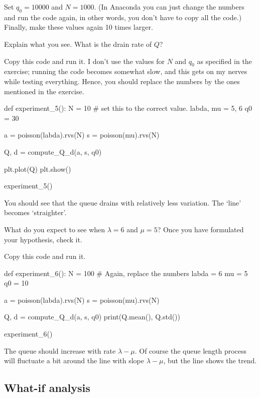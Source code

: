 \begin{exercise}
Set $q_0=10000$ and $N=1000$.  (In Anaconda you can just change the numbers and run the code again, in other words, you don't have to copy all the code.) Finally,  make these values again 10 times larger.

Explain what you see. What is the drain rate of $Q$?
\begin{solution}
  Copy this code and run it.
  I don't use the values for $N$ and $q_0$ as specified in the exercise; running the code becomes somewhat slow, and this gets on my nerves while testing everything.
  Hence, you should replace the numbers by the ones mentioned in the exercise.

\begin{pyverbatim}
def experiment_5():
    N = 10  # set this to the correct value.
    labda, mu = 5, 6
    q0 = 30

    a = poisson(labda).rvs(N)
    s = poisson(mu).rvs(N)

    Q, d = compute_Q_d(a, s, q0)

    plt.plot(Q)
    plt.show()


experiment_5()
\end{pyverbatim}

You should see that the queue drains with relatively less variation. The `line' becomes `straighter'.
\end{solution}
\end{exercise}

\begin{exercise}
What do you expect to see when $\lambda=6$ and $\mu=5$? Once you have formulated your hypothesis, check it.
\begin{solution}
Copy this code and run it.
\begin{pyverbatim}
def experiment_6():
    N = 100  # Again, replace the numbers
    labda = 6
    mu = 5
    q0 = 10

    a = poisson(labda).rvs(N)
    s = poisson(mu).rvs(N)

    Q, d = compute_Q_d(a, s, q0)
    print(Q.mean(), Q.std())


experiment_6()
\end{pyverbatim}
  The queue should increase with rate $\lambda - \mu$. Of course the queue length process will fluctuate a bit around the line with slope $\lambda-\mu$, but the line shows the trend.
\end{solution}
\end{exercise}

\subsection{What-if analysis}
\label{sec:what-if-analysis}

